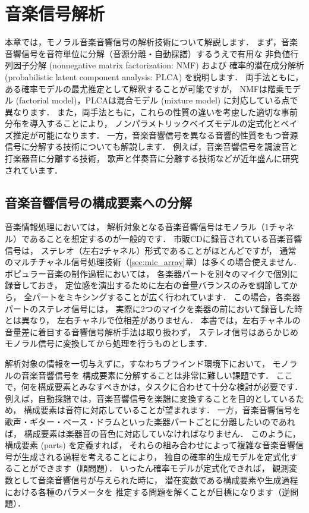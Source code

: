 ﻿\chapter{音楽信号解析}

\begin{leadbox}
本章では，モノラル音楽音響信号の解析技術について解説します．
まず，音楽音響信号を音符単位に分解（音源分離・自動採譜）するうえで有用な
非負値行列因子分解 (nonnegative matrix factorization: NMF) および
確率的潜在成分解析 (probabilistic latent component analysis: PLCA) を説明します．
両手法ともに，ある確率モデルの最尤推定として解釈することが可能ですが，
NMFは階乗モデル (factorial model)，PLCAは混合モデル (mixture model) に対応している点で異なります．
また，両手法ともに，これらの性質の違いを考慮した適切な事前分布を導入することにより，
ノンパラメトリックベイズモデルの定式化とベイズ推定が可能になります．
一方，音楽音響信号を異なる音響的性質をもつ音源信号に分解する技術についても解説します．
例えば，音楽音響信号を調波音と打楽器音に分離する技術，
歌声と伴奏音に分離する技術などが近年盛んに研究されています．

\end{leadbox}

\section{音楽音響信号の構成要素への分解}
\label{sec:introduction}

音楽情報処理においては，
解析対象となる音楽音響信号はモノラル（1チャネル）であることを想定するのが一般的です．
市販CDに録音されている音楽音響信号は，
ステレオ（左右2チャネル）形式であることがほとんどですが，
通常のマルチチャネル信号処理技術（\ref{sec:mic_array}章）は多くの場合使えません．
ポピュラー音楽の制作過程においては，
各楽器パートを別々のマイクで個別に録音しておき，
定位感を演出するために左右の音量バランスのみを調節してから，
全パートをミキシングすることが広く行われています．
この場合，各楽器パートのステレオ信号には，
実際に2つのマイクを楽器の前において録音した時とは異なり，
左右チャネルで位相差がありません．
本書では，左右チャネルの音量差に着目する音響信号解析手法は取り扱わず，
ステレオ信号はあらかじめモノラル信号に変換してから処理を行うものとします．

解析対象の情報を一切与えずに，すなわちブラインド環境下において，
モノラルの音楽音響信号を
構成要素に分解することは非常に難しい課題です．
ここで，何を構成要素とみなすべきかは，タスクに合わせて十分な検討が必要です．
例えば，自動採譜では，音楽音響信号を楽譜に変換することを目的としているため，
構成要素は音符に対応していることが望まれます．
一方，音楽音響信号を
歌声・ギター・ベース・ドラムといった楽器パートごとに分離したいのであれば，
構成要素は楽器音の音色に対応していなければなりません．
このように，構成要素 (parts) を定義すれば，
それらの組み合わせによって複雑な音楽音響信号が生成される過程を考えることにより，
独自の確率的生成モデルを定式化することができます（順問題）．
いったん確率モデルが定式化できれば，
観測変数として音楽音響信号が与えられた時に，
潜在変数である構成要素や生成過程における各種のパラメータを
推定する問題を解くことが目標になります（逆問題）．

